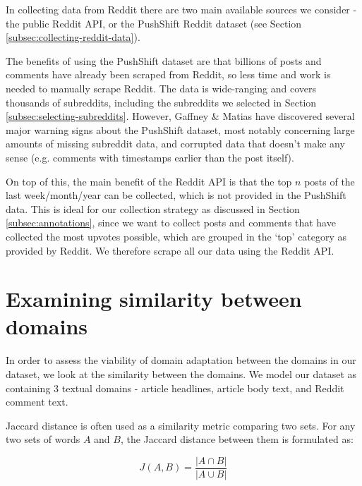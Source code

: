 In collecting data from Reddit there are two main available sources we consider - the public Reddit API, or the PushShift Reddit dataset (see Section \ref{subsec:collecting-reddit-data}).

The benefits of using the PushShift dataset are that billions of posts and comments have already been scraped from Reddit, so less time and work is needed to manually scrape Reddit. The data is wide-ranging and covers thousands of subreddits, including the subreddits we selected in Section \ref{subsec:selecting-subreddits}. However, Gaffney \& Matias \cite{pushshift-problems} have discovered several major warning signs about the PushShift dataset, most notably concerning large amounts of missing subreddit data, and corrupted data that doesn't make any sense (e.g. comments with timestamps earlier than the post itself).

On top of this, the main benefit of the Reddit API is that the top $ n $ posts of the last week/month/year can be collected, which is not provided in the PushShift data. This is ideal for our collection strategy as discussed in Section \ref{subsec:annotations}, since we want to collect posts and comments that have collected the most upvotes possible, which are grouped in the `top' category as provided by Reddit. We therefore scrape all our data using the Reddit API.

\section{Examining similarity between domains} \label{sec:domain-similarity}

In order to assess the viability of domain adaptation between the domains in our dataset, we look at the similarity between the domains. We model our dataset as containing 3 textual domains - article headlines, article body text, and Reddit comment text.

Jaccard distance is often used as a similarity metric comparing two sets. For any two sets of words $ A $ and $ B $, the Jaccard distance between them is formulated as:

\begin{equation}
    J(A, B) = \frac{|A \cap B|}{|A \cup B|}
\end{equation}


